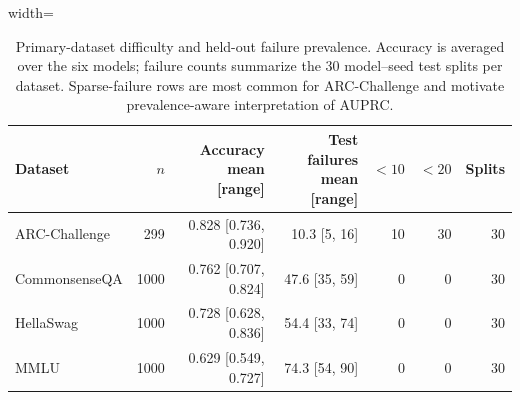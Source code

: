 \begin{table}[t]
\centering
\small
\caption{Primary-dataset difficulty and held-out failure prevalence. Accuracy is averaged over the six models; failure counts summarize the 30 model--seed test splits per dataset. Sparse-failure rows are most common for ARC-Challenge and motivate prevalence-aware interpretation of AUPRC.}
\label{tab:dataset-failure-summary}
\begin{adjustbox}{width=\textwidth}
\begin{tabular}{lrrrrrr}
\toprule
Dataset & $n$ & Accuracy mean [range] & Test failures mean [range] & $<10$ & $<20$ & Splits \\
\midrule
ARC-Challenge & 299 & 0.828 [0.736, 0.920] & 10.3 [5, 16] & 10 & 30 & 30 \\
CommonsenseQA & 1000 & 0.762 [0.707, 0.824] & 47.6 [35, 59] & 0 & 0 & 30 \\
HellaSwag & 1000 & 0.728 [0.628, 0.836] & 54.4 [33, 74] & 0 & 0 & 30 \\
MMLU & 1000 & 0.629 [0.549, 0.727] & 74.3 [54, 90] & 0 & 0 & 30 \\
\bottomrule
\end{tabular}
\end{adjustbox}
\end{table}

